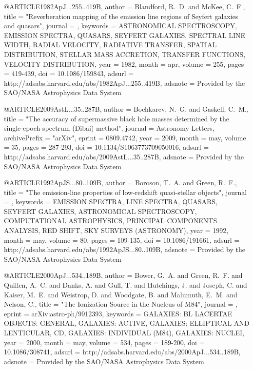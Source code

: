 \documentclass[twocolumn]{aastex62}
\begin{document}
@ARTICLE{1982ApJ...255..419B,
   author = {{Blandford}, R.~D. and {McKee}, C.~F.},
    title = "{Reverberation mapping of the emission line regions of Seyfert galaxies and quasars}",
  journal = {\apj},
 keywords = {ASTRONOMICAL SPECTROSCOPY, EMISSION SPECTRA, QUASARS, SEYFERT GALAXIES, SPECTRAL LINE WIDTH, RADIAL VELOCITY, RADIATIVE TRANSFER, SPATIAL DISTRIBUTION, STELLAR MASS ACCRETION, TRANSFER FUNCTIONS, VELOCITY DISTRIBUTION},
     year = 1982,
    month = apr,
   volume = 255,
    pages = {419-439},
      doi = {10.1086/159843},
   adsurl = {http://adsabs.harvard.edu/abs/1982ApJ...255..419B},
  adsnote = {Provided by the SAO/NASA Astrophysics Data System}
}

@ARTICLE{2009AstL...35..287B,
   author = {{Bochkarev}, N.~G. and {Gaskell}, C.~M.},
    title = "{The accuracy of supermassive black hole masses determined by the single-epoch spectrum (Dibai) method}",
  journal = {Astronomy Letters},
archivePrefix = "arXiv",
   eprint = {0809.4742},
     year = 2009,
    month = may,
   volume = 35,
    pages = {287-293},
      doi = {10.1134/S1063773709050016},
   adsurl = {http://adsabs.harvard.edu/abs/2009AstL...35..287B},
  adsnote = {Provided by the SAO/NASA Astrophysics Data System}
}


@ARTICLE{1992ApJS...80..109B,
   author = {{Boroson}, T.~A. and {Green}, R.~F.},
    title = "{The emission-line properties of low-redshift quasi-stellar objects}",
  journal = {\apjs},
 keywords = {EMISSION SPECTRA, LINE SPECTRA, QUASARS, SEYFERT GALAXIES, ASTRONOMICAL SPECTROSCOPY, COMPUTATIONAL ASTROPHYSICS, PRINCIPAL COMPONENTS ANALYSIS, RED SHIFT, SKY SURVEYS (ASTRONOMY)},
     year = 1992,
    month = may,
   volume = 80,
    pages = {109-135},
      doi = {10.1086/191661},
   adsurl = {http://adsabs.harvard.edu/abs/1992ApJS...80..109B},
  adsnote = {Provided by the SAO/NASA Astrophysics Data System}
}


@ARTICLE{2000ApJ...534..189B,
   author = {{Bower}, G.~A. and {Green}, R.~F. and {Quillen}, A.~C. and {Danks}, A. and 
	{Gull}, T. and {Hutchings}, J. and {Joseph}, C. and {Kaiser}, M.~E. and 
	{Weistrop}, D. and {Woodgate}, B. and {Malumuth}, E.~M. and 
	{Nelson}, C.},
    title = "{The Ionization Source in the Nucleus of M84}",
  journal = {\apj},
   eprint = {arXiv:astro-ph/9912393},
 keywords = {GALAXIES: BL LACERTAE OBJECTS: GENERAL, GALAXIES: ACTIVE, GALAXIES: ELLIPTICAL AND LENTICULAR, CD, GALAXIES: INDIVIDUAL (M84), GALAXIES: NUCLEI},
     year = 2000,
    month = may,
   volume = 534,
    pages = {189-200},
      doi = {10.1086/308741},
   adsurl = {http://adsabs.harvard.edu/abs/2000ApJ...534..189B},
  adsnote = {Provided by the SAO/NASA Astrophysics Data System}
}
\end{document}

